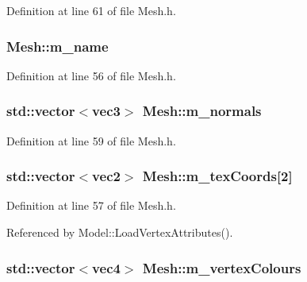 Definition at line 61 of file Mesh.\+h.

\subsubsection[{\texorpdfstring{m\+\_\+name}{m_name}}]{ Mesh\+::m\+\_\+name\hspace{0.3cm}{\ttfamily [private]}}\hypertarget{class_mesh_a6bcd1a563dee5297ad071a44f81dada0}{}\label{class_mesh_a6bcd1a563dee5297ad071a44f81dada0}


Definition at line 56 of file Mesh.\+h.

\subsubsection[{\texorpdfstring{m\+\_\+normals}{m_normals}}]{\setlength{\rightskip}{0pt plus 5cm}std\+::vector$<${\bf vec3}$>$ Mesh\+::m\+\_\+normals\hspace{0.3cm}{\ttfamily [private]}}\hypertarget{class_mesh_af8247fe75ace9282a2910930fead2b5f}{}\label{class_mesh_af8247fe75ace9282a2910930fead2b5f}


Definition at line 59 of file Mesh.\+h.

\subsubsection[{\texorpdfstring{m\+\_\+tex\+Coords}{m_texCoords}}]{\setlength{\rightskip}{0pt plus 5cm}std\+::vector$<${\bf vec2}$>$ Mesh\+::m\+\_\+tex\+Coords\mbox{[}2\mbox{]}\hspace{0.3cm}{\ttfamily [private]}}\hypertarget{class_mesh_aa53a65ca2e0c80a17c5f86620c572e8f}{}\label{class_mesh_aa53a65ca2e0c80a17c5f86620c572e8f}


Definition at line 57 of file Mesh.\+h.



Referenced by Model\+::\+Load\+Vertex\+Attributes().

\subsubsection[{\texorpdfstring{m\+\_\+vertex\+Colours}{m_vertexColours}}]{\setlength{\rightskip}{0pt plus 5cm}std\+::vector$<${\bf vec4}$>$ Mesh\+::m\+\_\+vertex\+Colours\hspace{0.3cm}{\ttfamily [private]}}\hypertarget{class_mesh_aec912675a7a52daf1d8096160384fbe8}{}\label{class_mesh_aec912675a7a52daf1d8096160384fbe8}


